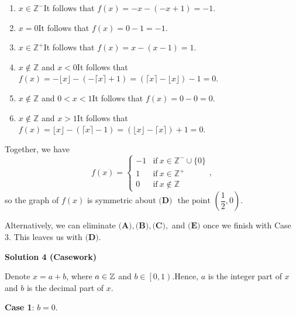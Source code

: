 \begin{enumerate}
            \begin{enumerate} 
        \item $x\in\mathbb{Z}^-$It follows that $f(x)=-x-(-x+1)=-1.$

        \item $x=0$It follows that $f(x)=0-1=-1.$

        \item $x\in\mathbb{Z}^+$It follows that $f(x)=x-(x-1)=1.$

        \item $x\not\in\mathbb{Z}$ and $x<0$It follows that $f(x)=-\lfloor x \rfloor - (-\lceil x\rceil+1)=(\lceil x \rceil - \lfloor x \rfloor)-1=0.$

        \item $x\not\in\mathbb{Z}$ and $0<x<1$It follows that $f(x)=0-0=0.$

        \item $x\not\in\mathbb{Z}$ and $x>1$It follows that $f(x)=\lfloor x \rfloor - (\lceil x\rceil-1)=(\lfloor x \rfloor - \lceil x \rceil)+1=0.$

            \end{enumerate}
            Together, we have 
 \[f(x)=\begin{cases} -1 & \mathrm{if} \ x\in\mathbb{Z}^{-}\cup\{0\} \\  1 & \mathrm{if} \ x\in\mathbb{Z}^{+} \\ 0 & \mathrm{if} \ x\not\in\mathbb{Z} \end{cases},\]so the graph of $f(x)$ is symmetric about $\boxed{\textbf{(D) }\text{ the point }\left(\dfrac12, 0\right)}.$

 Alternatively, we can eliminate $\textbf{(A)}, \textbf{(B)}, \textbf{(C)},$ and $\textbf{(E)}$ once we finish with Case 3. This leaves us with $\textbf{(D)}.$




\textbf{Solution 4 (Casework)}

Denote $x = a + b$, where $a \in \Bbb Z$ and $b \in \left[ 0 , 1 \right)$.Hence, $a$ is the integer part of $x$ and $b$ is the decimal part of $x$.

 \textbf{Case 1}: $b = 0$.


\end{enumerate}
